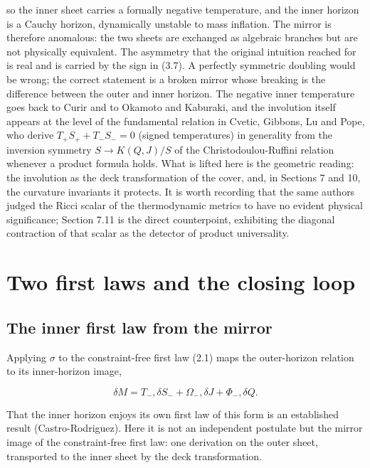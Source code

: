 \documentclass[11pt]{article}
\begin{document}
so the inner sheet carries a formally negative temperature, and the inner horizon is a Cauchy horizon, dynamically unstable to mass inflation. The mirror is therefore anomalous: the two sheets are exchanged as algebraic branches but are not physically equivalent. The asymmetry that the original intuition reached for is real and is carried by the sign in (3.7). A perfectly symmetric doubling would be wrong; the correct statement is a broken mirror whose breaking is the difference between the outer and inner horizon. The negative inner temperature goes back to Curir and to Okamoto and Kaburaki, and the involution itself appears at the level of the fundamental relation in Cvetic, Gibbons, Lu and Pope, who derive $T_+S_+ + T_-S_- = 0$ (signed temperatures) in generality from the inversion symmetry $S \to K(Q,J)/S$ of the Christodoulou-Ruffini relation whenever a product formula holds. What is lifted here is the geometric reading: the involution as the deck transformation of the cover, and, in Sections 7 and 10, the curvature invariants it protects. It is worth recording that the same authors judged the Ricci scalar of the thermodynamic metrics to have no evident physical significance; Section 7.11 is the direct counterpoint, exhibiting the diagonal contraction of that scalar as the detector of product universality.



\section{Two first laws and the closing loop}

\subsection{The inner first law from the mirror}

Applying $\sigma$ to the constraint-free first law (2.1) maps the outer-horizon relation to its inner-horizon image,

\begin{equation*}
\delta M = T_- ,\delta S_- + \Omega_- ,\delta J + \Phi_- ,\delta Q .
\tag{4.1}
\end{equation*}

That the inner horizon enjoys its own first law of this form is an established result (Castro-Rodriguez). Here it is not an independent postulate but the mirror image of the constraint-free first law: one derivation on the outer sheet, transported to the inner sheet by the deck transformation.
\end{document}
